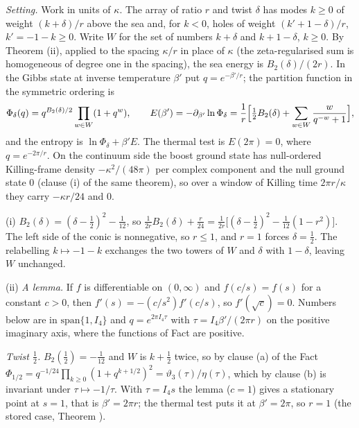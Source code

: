 \emph{Setting.} Work in units of $\kappa$. The array of ratio $r$ and twist $\delta$ has modes $k \ge 0$ of weight $(k + \delta)/r$ above the sea and, for $k < 0$, holes of weight $(k' + 1 - \delta)/r$, $k' = -1 - k \ge 0$. Write $W$ for the set of numbers $k + \delta$ and $k + 1 - \delta$, $k \ge 0$. By Theorem (ii), applied to the spacing $\kappa/r$ in place of $\kappa$ (the zeta-regularised sum is homogeneous of degree one in the spacing), the sea energy is $B_{2}(\delta)/(2r)$. In the Gibbs state at inverse temperature $\beta'$ put $q = e^{-\beta'/r}$; the partition function in the symmetric ordering is
\[
\Phi_{\delta}(q) = q^{B_{2}(\delta)/2}\prod_{w \in W}(1 + q^{w}), \qquad E(\beta') = -\partial_{\beta'}\ln\Phi_{\delta} = \frac{1}{r}\Bigl[\tfrac12 B_{2}(\delta) + \sum_{w \in W}\frac{w}{q^{-w} + 1}\Bigr],
\]
and the entropy is $\ln\Phi_{\delta} + \beta' E$. The thermal test is $E(2\pi) = 0$, where $q = e^{-2\pi/r}$. On the continuum side the boost ground state has null-ordered Killing-frame density $-\kappa^{2}/(48\pi)$ per complex component and the null ground state $0$ (clause (i) of the same theorem), so over a window of Killing time $2\pi r/\kappa$ they carry $-\kappa r/24$ and $0$.

(i) $B_{2}(\delta) = (\delta - \tfrac12)^{2} - \tfrac{1}{12}$, so $\tfrac{1}{2r}B_{2}(\delta) + \tfrac{r}{24} = \tfrac{1}{2r}\bigl[(\delta - \tfrac12)^{2} - \tfrac{1}{12}(1 - r^{2})\bigr]$. The left side of the conic is nonnegative, so $r \le 1$, and $r = 1$ forces $\delta = \tfrac12$. The relabelling $k \mapsto -1 - k$ exchanges the two towers of $W$ and $\delta$ with $1 - \delta$, leaving $W$ unchanged.

(ii) \emph{A lemma.} If $f$ is differentiable on $(0, \infty)$ and $f(c/s) = f(s)$ for a constant $c > 0$, then $f'(s) = -(c/s^{2})f'(c/s)$, so $f'(\sqrt{c}) = 0$. Numbers below are in $\mathrm{span}\{1, I_{4}\}$ and $q = e^{2\pi I_{4}\tau}$ with $\tau = I_{4}\beta'/(2\pi r)$ on the positive imaginary axis, where the functions of Fact  are positive.

\emph{Twist $\tfrac12$.} $B_{2}(\tfrac12) = -\tfrac{1}{12}$ and $W$ is $k + \tfrac12$ twice, so by clause (a) of the Fact $\Phi_{1/2} = q^{-1/24}\prod_{k \ge 0}(1 + q^{k + 1/2})^{2} = \vartheta_{3}(\tau)/\eta(\tau)$, which by clause (b) is invariant under $\tau \mapsto -1/\tau$. With $\tau = I_{4}s$ the lemma ($c = 1$) gives a stationary point at $s = 1$, that is $\beta' = 2\pi r$; the thermal test puts it at $\beta' = 2\pi$, so $r = 1$ (the stored case, Theorem ).

